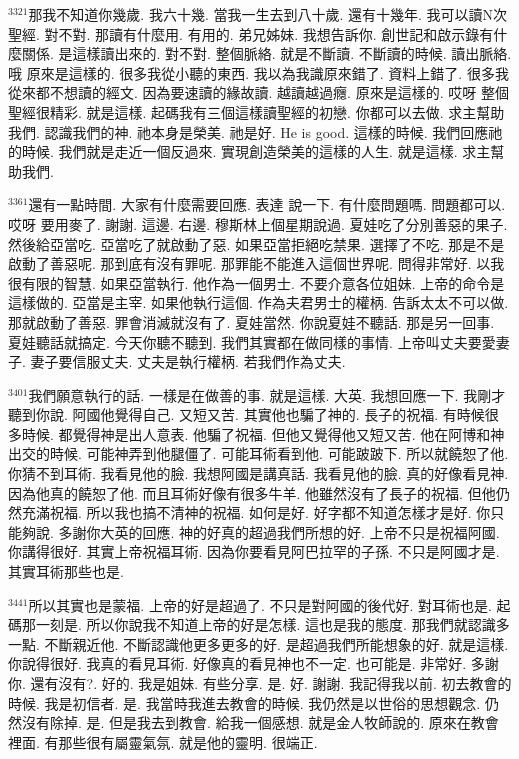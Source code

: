 \documentclass{book}
\begin{document}
$^{3321}$那我不知道你幾歲.
我六十幾.
當我一生去到八十歲.
還有十幾年.
我可以讀N次聖經.
對不對.
那讀有什麼用.
有用的.
弟兄姊妹.
我想告訴你.
創世記和啟示錄有什麼關係.
是這樣讀出來的.
對不對.
整個脈絡.
就是不斷讀.
不斷讀的時候.
讀出脈絡.
哦 原來是這樣的.
很多我從小聽的東西.
我以為我識原來錯了.
資料上錯了.
很多我從來都不想讀的經文.
因為要速讀的緣故讀.
越讀越過癮.
原來是這樣的.
哎呀 整個聖經很精彩.
就是這樣.
起碼我有三個這樣讀聖經的初戀.
你都可以去做.
求主幫助我們.
認識我們的神.
祂本身是榮美.
祂是好.
He is good.
這樣的時候.
我們回應祂的時候.
我們就是走近一個反過來.
實現創造榮美的這樣的人生.
就是這樣.
求主幫助我們.

$^{3361}$還有一點時間.
大家有什麼需要回應.
表達 說一下.
有什麼問題嗎.
問題都可以.
哎呀 要用麥了.
謝謝.
這邊.
右邊.
穆斯林上個星期說過.
夏娃吃了分別善惡的果子.
然後給亞當吃.
亞當吃了就啟動了惡.
如果亞當拒絕吃禁果.
選擇了不吃.
那是不是啟動了善惡呢.
那到底有沒有罪呢.
那罪能不能進入這個世界呢.
問得非常好.
以我很有限的智慧.
如果亞當執行.
他作為一個男士.
不要介意各位姐妹.
上帝的命令是這樣做的.
亞當是主宰.
如果他執行這個.
作為夫君男士的權柄.
告訴太太不可以做.
那就啟動了善惡.
罪會消滅就沒有了.
夏娃當然.
你說夏娃不聽話.
那是另一回事.
夏娃聽話就搞定.
今天你聽不聽到.
我們其實都在做同樣的事情.
上帝叫丈夫要愛妻子.
妻子要信服丈夫.
丈夫是執行權柄.
若我們作為丈夫.

$^{3401}$我們願意執行的話.
一樣是在做善的事.
就是這樣.
大英.
我想回應一下.
我剛才聽到你說.
阿國他覺得自己.
又短又苦.
其實他也騙了神的.
長子的祝福.
有時候很多時候.
都覺得神是出人意表.
他騙了祝福.
但他又覺得他又短又苦.
他在阿博和神出交的時候.
可能神弄到他腿僵了.
可能耳術看到他.
可能跛跛下.
所以就饒恕了他.
你猜不到耳術.
我看見他的臉.
我想阿國是講真話.
我看見他的臉.
真的好像看見神.
因為他真的饒恕了他.
而且耳術好像有很多牛羊.
他雖然沒有了長子的祝福.
但他仍然充滿祝福.
所以我也搞不清神的祝福.
如何是好.
好字都不知道怎樣才是好.
你只能夠說.
多謝你大英的回應.
神的好真的超過我們所想的好.
上帝不只是祝福阿國.
你講得很好.
其實上帝祝福耳術.
因為你要看見阿巴拉罕的子孫.
不只是阿國才是.
其實耳術那些也是.

$^{3441}$所以其實也是蒙福.
上帝的好是超過了.
不只是對阿國的後代好.
對耳術也是.
起碼那一刻是.
所以你說我不知道上帝的好是怎樣.
這也是我的態度.
那我們就認識多一點.
不斷親近他.
不斷認識他更多更多的好.
是超過我們所能想象的好.
就是這樣.
你說得很好.
我真的看見耳術.
好像真的看見神也不一定.
也可能是.
非常好.
多謝你.
還有沒有?.
好的.
我是姐妹.
有些分享.
是.
好.
謝謝.
我記得我以前.
初去教會的時候.
我是初信者.
是.
我當時我進去教會的時候.
我仍然是以世俗的思想觀念.
仍然沒有除掉.
是.
但是我去到教會.
給我一個感想.
就是金人牧師說的.
原來在教會裡面.
有那些很有屬靈氣氛.
就是他的靈明.
很端正.
\end{document}
